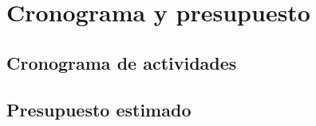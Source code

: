 
\chapter{Cronograma y presupuesto}

\label{Chapter4}


\section{Cronograma de actividades}



\section{Presupuesto estimado}
